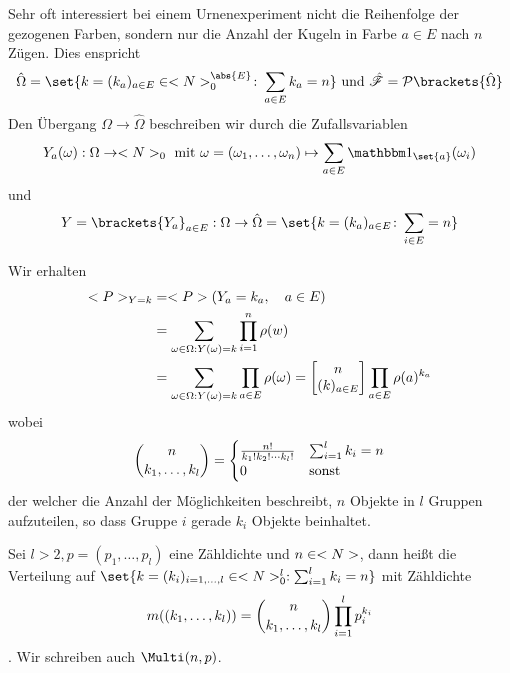 Sehr oft interessiert bei einem Urnenexperiment nicht die Reihenfolge der gezogenen Farben, sondern nur die Anzahl der Kugeln in Farbe $a \in E$ nach $n$ Zügen. Dies enspricht
\begin{align}
	 \hat{\Omega} 
	 = \set{k = (k_a)_{a \in E} \in \N_{0}^{\abs{E}} \colon \sum_{a \in E} k_a = n}
	 \und \hat{\sigF} = \pows\brackets{\hat{\Omega}}\notag
\end{align}
Den Übergang $\Omega \to \hat{\Omega}$ beschreiben wir durch die Zufallsvariablen
\begin{align}
	Y_a(\omega): \Omega \to \N_{0} \mit \omega = (\omega_1,\dots, \omega_n)\mapsto \sum_{a \in E} \indi_{\set{a}}(\omega_i)\notag
\end{align}
und
\begin{align}
	Y = \brackets{Y_a}_{a\in E}: \Omega \to \hat{\Omega} = \set{k = (k_a)_{a\in E}\colon \sum_{i \in E} = n}\notag
\end{align}


Wir erhalten
\begin{align}
	<P>_{Y = k} &= <P>(Y_a = k_a, \quad a \in E)\\
	&= \sum_{\omega \in \Omega:Y(\omega) = k} \prod_{i=1}^{n} \rho(w)\\
	&= \sum_{\omega \in \Omega:Y(\omega) = k} \prod_{a \in E} \rho(\omega) = \begin{bmatrix}
	n \\
	(k)_{a\in E}
	\end{bmatrix}
	\prod_{a \in E} \rho(a)^{k_a}\notag
\end{align}
wobei
\begin{align}
	\binom{n}{k_1, \dots, k_l} = \begin{cases}
	\frac{n!}{k_1 ! k_2 ! \cdots k_l !} & \sum_{i=1}^{l} k_i = n\\
	0 & \text{sonst }
	\end{cases}\notag
\end{align}
der  welcher die Anzahl der Möglichkeiten beschreibt, $n$ Objekte in $l$ Gruppen aufzuteilen, so dass Gruppe $i$ gerade $k_i$ Objekte beinhaltet.

\begin{definition}
	Sei $l > 2, p = (p_1, \dots, p_l)$ eine Zähldichte und $n \in <N>$, dann heißt die Verteilung auf $\set{k = (k_i)_{i=1,\dots,l} \in \N_{0}^{l} : \sum_{i=1}^{l} k_i = n}$ mit Zähldichte
	\begin{align}
		m((k_1,\dots,k_l)) = \binom{n}{k_1, \dots, k_l}\prod_{i=1}^{l} p_i^{k_i}\notag
	\end{align}
	. Wir schreiben auch $\Multi(n,p)$. %
\end{definition}

